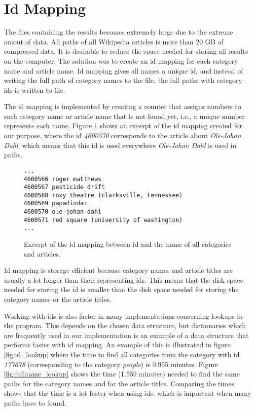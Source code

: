 \section{Id Mapping}
The files containing the results becomes extremely large due to the extreme amout of data. All paths of all Wikipedia articles is more than 20 GB of compressed data. It is desirable to reduce the space needed for storing all results on the computer. The solution was to create an id mapping for each category name and article name. Id mapping gives all names a unique id, and instead of writing the full path of category names to the file, the full paths with category ids is written to file. 

The id mapping is implemented by creating a counter that assigns numbers to each category name or article name that is not found yet, i.e., a unique number represents each name. Figure \ref{fig:idmapping} shows an excerpt of the id mapping created for our purpose, where the id \emph{4600570} corresponds to the article about \emph{Ole-Johan Dahl}, which means that this id is used everywhere \emph{Ole-Johan Dahl} is used in paths. 

\begin{figure}[h]
\centering
\begin{lstlisting}
...
4600566 roger matthews
4600567 pesticide drift
4600568 roxy theatre (clarksville, tennessee)
4600569 papadindar
4600570 ole-johan dahl
4600571 red square (university of washington)
...
\end{lstlisting}
\caption[Id mapping example]{Excerpt of the id mapping between id and the name of all categories and articles.}
\label{fig:idmapping}
\end{figure}

Id mapping is storage efficient because category names and article titles are usually a  lot longer than their representing ids. This means that the disk space needed for storing the id is smaller than the disk space needed for storing the category names or the article titles. 

Working with ids is also faster in many implementations concerning lookups in the program. This depends on the chosen data structure, but dictionaries which are frequently used in our implementation is an example of a data structure that performs faster with id mapping. An example of this is illustrated in figure \ref{fig:id_lookup} where the time to find all categories from the category with id \emph{177678} (corresponding to the category \emph{people}) is 0.955 minutes. Figure \ref{fig:fullname_lookup} shows the time (1.559 minutes) needed to find the same paths for the category names and for the article titles. Comparing the times shows that the time is a lot faster when using ids, which is important when many paths have to found.

